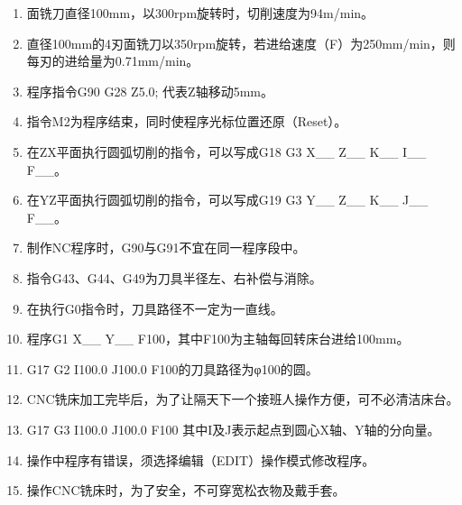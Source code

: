 \documentclass[12pt,twocolumn,landscape,UTF8,twoside]{ctexart}
\begin{document}
\begin{spacing}{1.3}
\begin{enumerate} [1、]
\item 面铣刀直径100mm，以300rpm旋转时，切削速度为94m/min。
\item 直径100mm的4刃面铣刀以350rpm旋转，若进给速度（F）为250mm/min，则每刃的进给量为0.71mm/min。
\item 程序指令G90 G28 Z5.0; 代表Z轴移动5mm。
\item 指令M2为程序结束，同时使程序光标位置还原（Reset）。
\item 在ZX平面执行圆弧切削的指令，可以写成G18 G3 X\_\_ Z\_\_ K\_\_ I\_\_ F\_\_。
\item 在YZ平面执行圆弧切削的指令，可以写成G19 G3 Y\_\_ Z\_\_ K\_\_ J\_\_ F\_\_。
\item 制作NC程序时，G90与G91不宜在同一程序段中。
\item 指令G43、G44、G49为刀具半径左、右补偿与消除。
\item 在执行G0指令时，刀具路径不一定为一直线。
\item 程序G1 X\_\_ Y\_\_ F100，其中F100为主轴每回转床台进给100mm。
\item G17 G2 I100.0 J100.0 F100的刀具路径为φ100的圆。
\item CNC铣床加工完毕后，为了让隔天下一个接班人操作方便，可不必清洁床台。
\item G17 G3 I100.0 J100.0 F100 其中I及J表示起点到圆心X轴、Y轴的分向量。
\item 操作中程序有错误，须选择编辑（EDIT）操作模式修改程序。
\item 操作CNC铣床时，为了安全，不可穿宽松衣物及戴手套。
	

\end{enumerate}
\end{spacing}
\end{document}
